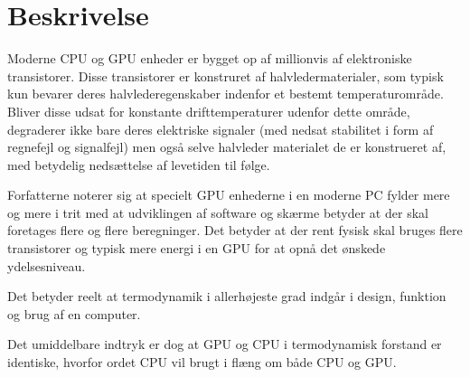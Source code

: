 \section{Beskrivelse}

Moderne CPU og GPU enheder er bygget op af millionvis af elektroniske transistorer.  Disse transistorer er konstruret af halvledermaterialer, som typisk kun bevarer deres halvlederegenskaber indenfor et bestemt temperaturområde. Bliver disse udsat for konstante drifttemperaturer udenfor dette område, degraderer ikke bare deres elektriske signaler (med nedsat stabilitet i form af regnefejl og signalfejl) men også selve halvleder materialet de er konstrueret af, med betydelig nedsættelse af levetiden til følge.

Forfatterne noterer sig at specielt GPU enhederne i en moderne PC fylder mere og mere i trit med at udviklingen af software og skærme betyder at der skal foretages flere og flere beregninger. Det betyder at der rent fysisk skal bruges flere transistorer og typisk mere energi i en GPU for at opnå det ønskede ydelsesniveau.

Det betyder reelt at termodynamik i allerhøjeste grad indgår i design, funktion og brug af en computer.

Det umiddelbare indtryk er dog at GPU og CPU i termodynamisk forstand er identiske, hvorfor ordet CPU vil brugt i flæng om både CPU og GPU.


